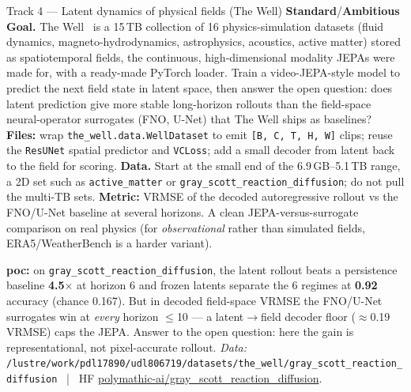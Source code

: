 \documentclass{article}
\newcommand{\code}[1]{\texttt{\small #1}}
\newcommand{\diffmed}{\colorbox{ebamber!18}{\textcolor{ebamber}{\small\bfseries Standard}}}
\newcommand{\diffhard}{\colorbox{ebred!15}{\textcolor{ebred}{\small\bfseries Ambitious}}}
\begin{document}
\begin{trackbox}{Track 4 --- Latent dynamics of physical fields (The Well) \hfill \diffmed{}/\diffhard{}}
\textbf{Goal.} The Well~\citep{the_well} is a 15\,TB collection of 16
physics-simulation datasets (fluid dynamics, magneto-hydrodynamics, astrophysics,
acoustics, active matter) stored as spatiotemporal fields, the continuous,
high-dimensional modality JEPAs were made for, with a ready-made PyTorch loader.
Train a video-JEPA-style model to predict the next field state in latent space, then
answer the open question: does latent prediction give more stable long-horizon
rollouts than the field-space neural-operator surrogates (FNO, U-Net) that The Well
ships as baselines? \textbf{Files:} wrap \code{the\_well.data.WellDataset} to emit
\code{[B, C, T, H, W]} clips; reuse the \code{ResUNet} spatial predictor and
\code{VCLoss}; add a small decoder from latent back to the field for scoring.
\textbf{Data.} Start at the small end of the 6.9\,GB--5.1\,TB range, a 2D set such
as \code{active\_matter} or \code{gray\_scott\_reaction\_diffusion}; do not pull the
multi-TB sets. \textbf{Metric:} VRMSE of the decoded autoregressive rollout vs the
FNO/U-Net baseline at several horizons. A clean JEPA-versus-surrogate comparison on
real physics (for \emph{observational} rather than simulated fields,
ERA5/WeatherBench is a harder variant).

\smallskip
\textbf{poc:} on \code{gray\_scott\_reaction\_diffusion}, the latent rollout beats a
persistence baseline \textbf{4.5$\times$} at horizon 6 and frozen latents separate
the 6 regimes at \textbf{0.92} accuracy (chance 0.167). But in decoded field-space
VRMSE the FNO/U-Net surrogates win at \emph{every} horizon $\le$10 --- a
latent$\to$field decoder floor ($\approx$0.19 VRMSE) caps the JEPA. Answer to the
open question: here the gain is representational, not pixel-accurate rollout.
\emph{Data:} \code{/lustre/work/pdl17890/udl806719/datasets/the\_well/gray\_scott\_reaction\_diffusion}
~|~ HF \href{https://huggingface.co/datasets/polymathic-ai/gray_scott_reaction_diffusion}{polymathic-ai/gray\_scott\_reaction\_diffusion}.
\end{trackbox}
\end{document}
